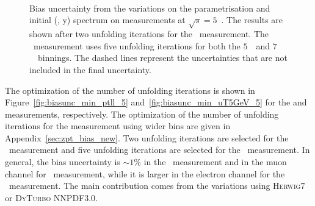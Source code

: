 \begin{figure}[h]
\centering
{}
\\
\\
\\
\caption{Bias uncertainty from the variations on the parametrisation and initial (\pt, y) spectrum on \ptz measurements at $\sqrt{s} = 5$~\TeV. The results are shown after two unfolding iterations for the \ptdilep\ measurement. The \ut\ measurement uses five unfolding iterations for both the $5$~\GeV\ and $7$~\GeV\ binnings. The dashed lines represent the uncertainties that are not included in the final uncertainty.}
\label{fig:bias_altunc_5}
\end{figure}

The optimization of the number of unfolding iterations is shown in Figure~\ref{fig:biasunc_min_ptll_5} and~\ref{fig:biasunc_min_uT5GeV_5} for the \ptdilep and \ut measurements, respectively.
The optimization of the number of unfolding iterations for the \ut measurement using wider bins are given in Appendix~\ref{sec:zpt_bias_new}.
Two unfolding iterations are selected for the \ptdilep\ measurement and five unfolding iterations are selected for the \ut\ measurement.
In general, the bias uncertainty is $\sim 1\%$ in the \ptdilep\ measurement and in the muon channel for \ut\  measurement, while it is larger in the electron channel for the \ut\ measurement.
The main contribution comes from the variations using \textsc{Herwig7} or \textsc{DyTurbo NNPDF3.0}.

